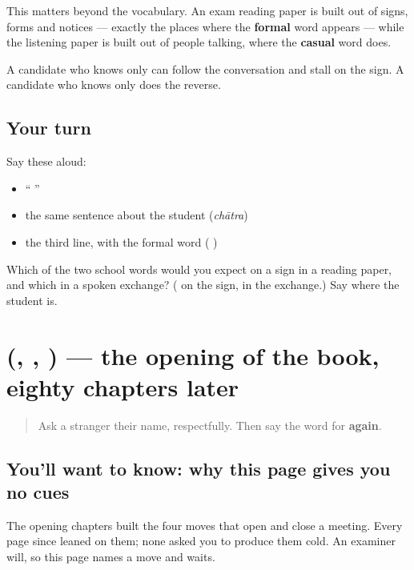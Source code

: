 \begin{grammarlens}[title={Grammar Lens: why the reading paper cares}]
This matters beyond the vocabulary. An exam reading paper is built out of signs, forms and notices — exactly the places where the \textbf{formal} word appears — while the listening paper is built out of people talking, where the \textbf{casual} word does.

A candidate who knows only \textbf{} can follow the conversation and stall on the sign. A candidate who knows only \textbf{} does the reverse.
\end{grammarlens}

\subsection*{Your turn}
Say these aloud:

\begin{itemize}
\raggedright
  \item \textquotedblleft{}   \textquotedblright{}
  \item the same sentence about the student (\emph{chātra})
  \item the third line, with the formal word (  )
\end{itemize}

\begin{tcolorbox}[breakable,colback=teal!4,colframe=teal!35!black,title={Before you move on}]
Which of the two school words would you expect on a sign in a reading paper, and which in a spoken exchange? ( on the sign,  in the exchange.) Say where the student is.
\end{tcolorbox}
\section[\texorpdfstring{(\hi{नाम}, \hi{कैसे}, \hi{फिर})}{(नाम, कैसे, फिर)}]{(, , ) — the opening of the book, eighty chapters later}

\label{lesson:HI-R89-the-first-four-chapters-again}



\begin{quote}
Ask a stranger their name, respectfully. Then say the word for \textbf{again}.
\end{quote}

\subsection*{You'll want to know: why this page gives you no cues}
The opening chapters built the four moves that open and close a meeting. Every page since leaned on them; none asked you to produce them cold. An examiner will, so this page names a move and waits.

